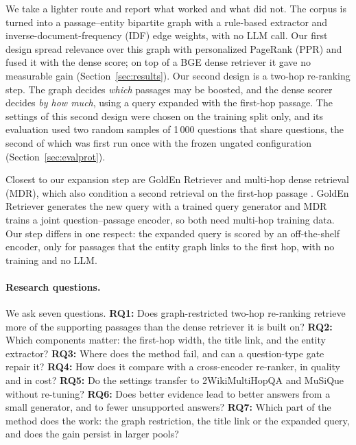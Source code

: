 \documentclass[a4paper,fleqn]{cas-sc}
\begin{document}
We take a lighter route and report what worked and what did not. The corpus is turned into a passage--entity bipartite graph with a rule-based extractor and inverse-document-frequency (IDF) edge weights, with no LLM call. Our first design spread relevance over this graph with personalized PageRank (PPR) and fused it with the dense score; on top of a BGE dense retriever it gave no measurable gain (Section~\ref{sec:results}). Our second design is a two-hop re-ranking step. The graph decides \emph{which} passages may be boosted, and the dense scorer decides \emph{by how much}, using a query expanded with the first-hop passage. The settings of this second design were chosen on the training split only, and its evaluation used two random samples of 1\,000 questions that share \nOverlapAB{} questions, the second of which was first run once with the frozen ungated configuration (Section~\ref{sec:evalprot}).

Closest to our expansion step are GoldEn Retriever and multi-hop dense retrieval (MDR), which also condition a second retrieval on the first-hop passage \citep{qi2019golden,xiong2021mdr}. GoldEn Retriever generates the new query with a trained query generator and MDR trains a joint question--passage encoder, so both need multi-hop training data. Our step differs in one respect: the expanded query is scored by an off-the-shelf encoder, only for passages that the entity graph links to the first hop, with no training and no LLM.

\paragraph{Research questions.} We ask seven questions. \textbf{RQ1:} Does graph-restricted two-hop re-ranking retrieve more of the supporting passages than the dense retriever it is built on? \textbf{RQ2:} Which components matter: the first-hop width, the title link, and the entity extractor? \textbf{RQ3:} Where does the method fail, and can a question-type gate repair it? \textbf{RQ4:} How does it compare with a cross-encoder re-ranker, in quality and in cost? \textbf{RQ5:} Do the settings transfer to 2WikiMultiHopQA and MuSiQue without re-tuning? \textbf{RQ6:} Does better evidence lead to better answers from a small generator, and to fewer unsupported answers? \textbf{RQ7:} Which part of the method does the work: the graph restriction, the title link or the expanded query, and does the gain persist in larger pools?
\end{document}
